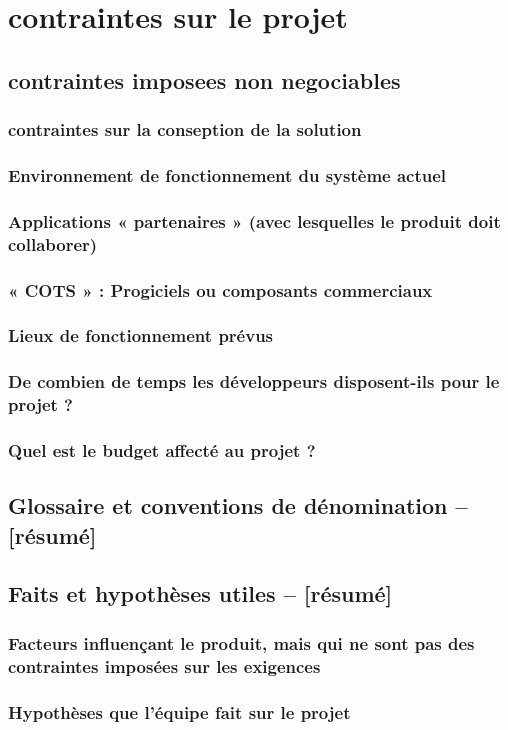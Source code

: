\documentclass[a4]{article}
\begin{document}
	\section{contraintes sur le projet}
		\subsection{contraintes imposees non negociables} 
			\subsubsection{contraintes sur la conseption de la solution}
			\subsubsection{ Environnement de fonctionnement du système actuel }
			\subsubsection{Applications « partenaires » (avec lesquelles le produit doit collaborer)}		
			\subsubsection{« COTS » : Progiciels ou composants commerciaux}
			\subsubsection{Lieux de fonctionnement prévus}
			\subsubsection{ De combien de temps les développeurs disposent-ils pour le projet ?}
			\subsubsection{ Quel est le budget affecté au projet ?}
		\subsection{Glossaire et conventions de dénomination – [résumé]}
		\subsection{Faits et hypothèses utiles – [résumé]}	
			\subsubsection{Facteurs influençant le produit, mais qui ne sont pas des contraintes imposées sur les exigences}
			\subsubsection{Hypothèses que l’équipe fait sur le projet}
		
		
		

							
\end{document}
